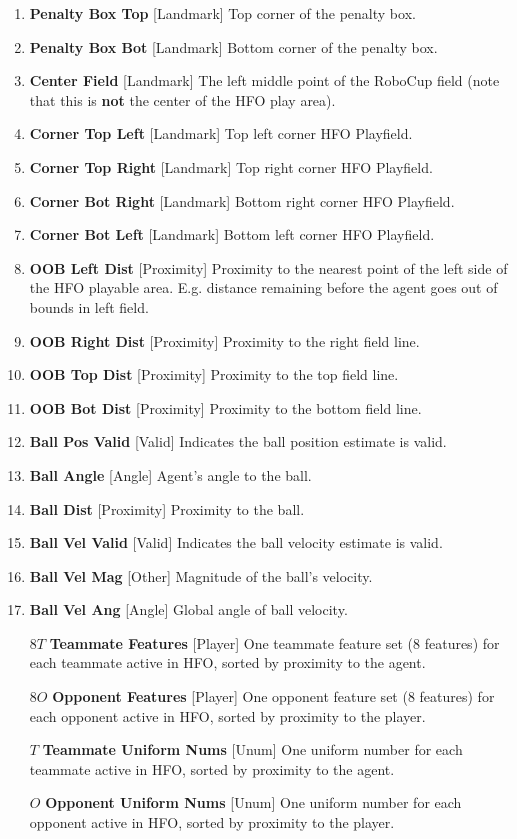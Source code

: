 \documentclass[12pt]{article}
\def\itemrange#1{%
\addtocounter{enumi}{1}%
\edef\labelenumi{\theenumi--\noexpand\theenumi}%
\addtocounter{enumi}{-1}%
\addtocounter{enumi}{#1}%
\item
\def\labelenumi{\theenumi}}
\renewcommand*{\labelenumi}{\theenumi}
\begin{document}
\begin{enumerate}[noitemsep]
  \itemrange{2}{\textbf{Penalty Box Top} [Landmark] Top corner of the penalty box.}
  \itemrange{2}{\textbf{Penalty Box Bot} [Landmark] Bottom corner of the penalty box.}
  \itemrange{2}{\textbf{Center Field} [Landmark] The left middle point of the RoboCup field
    (note that this is \textbf{not} the center of the HFO play area).}
  \itemrange{2}{\textbf{Corner Top Left} [Landmark] Top left corner HFO Playfield.}
  \itemrange{2}{\textbf{Corner Top Right} [Landmark] Top right corner HFO Playfield.}
  \itemrange{2}{\textbf{Corner Bot Right} [Landmark] Bottom right corner HFO Playfield.}
  \itemrange{2}{\textbf{Corner Bot Left} [Landmark] Bottom left corner HFO Playfield.}
  \item{\textbf{OOB Left Dist} [Proximity] Proximity to the nearest
    point of the left side of the HFO playable area. E.g. distance
    remaining before the agent goes out of bounds in left field.}
  \item{\textbf{OOB Right Dist} [Proximity] Proximity to the right
    field line.}
  \item{\textbf{OOB Top Dist} [Proximity] Proximity to the top field line.}
  \item{\textbf{OOB Bot Dist} [Proximity] Proximity to the bottom field line.}
  \item{\textbf{Ball Pos Valid} [Valid] Indicates the ball position estimate is valid.}
  \itemrange{1}{\textbf{Ball Angle} [Angle] Agent's angle to the ball.}
  \item{\textbf{Ball Dist} [Proximity] Proximity to the ball.}
  \item{\textbf{Ball Vel Valid} [Valid] Indicates the ball velocity estimate is valid.}
  \item{\textbf{Ball Vel Mag} [Other] Magnitude of the ball's velocity.}
  \itemrange{1}{\textbf{Ball Vel Ang} [Angle] Global angle of ball velocity.}
  \item [$8T$] {\textbf{Teammate Features} [Player] One teammate feature set (8 features)
	for each teammate active in HFO, sorted by proximity to the agent.}
  \item [$8O$] {\textbf{Opponent Features} [Player] One opponent feature set (8 features)
	for each opponent active in HFO, sorted by proximity to the player.}
  \item [$T$]  {\textbf{Teammate Uniform Nums} [Unum] One uniform number for each teammate active in HFO,
	sorted by proximity to the agent.}
  \item [$O$]  {\textbf{Opponent Uniform Nums} [Unum] One uniform number for each opponent active in HFO,
	sorted by proximity to the player.}
\end{enumerate}
\end{document}
